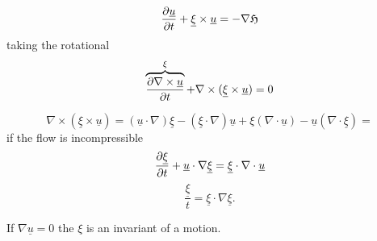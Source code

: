 \documentclass[11pt,oneside]{book}
\renewcommand{\vec}[1]{\underline{#1}}
\theoremstyle{definition} %
\theoremstyle{plain} %
\theoremstyle{remark} %
\theoremstyle{underline}
\begin{document}
  \begin{displaymath}
    \ptf{\vec u}{t} + \vec \xi \times \vec u = - \nabla \mf{H} 
  \end{displaymath}
  taking the rotational
  \begin{displaymath}
    \overbrace{\ptf{\nabla \times \vec u}{t}}^{\xi} + \nabla \times (\vec \xi \times \vec u) = 0 
  \end{displaymath}

  \begin{displaymath}
    \nabla \times (\vec \xi \times \vec u) = ( \vec u \cdot \nabla) \vec \xi - (\vec \xi \cdot \nabla) \vec u 
    + \xi (\nabla \cdot \vec u) - \vec u (\nabla \cdot \vec \xi)=
  \end{displaymath}
  if the flow is incompressible
  \begin{displaymath}
    \ptf{\vec \xi}{t} + \vec u \cdot \nabla \vec \xi = \vec \xi \cdot \nabla \cdot \vec u
  \end{displaymath}
  \begin{displaymath}
    \dfrac{\vec \xi}{t} = \vec \xi \cdot \nabla \vec \xi.
  \end{displaymath}

  If $\nabla \vec u = 0$ the $\xi $ is an invariant of a motion.
  
  

  
  
  
  
  
  
  
\end{document}
